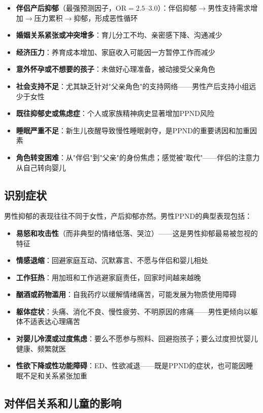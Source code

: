 \begin{enumerate}
\begin{itemize}[leftmargin=2cm]
	\item \textbf{伴侣产后抑郁}（最强预测因子，OR$=2.5$--3.0）：伴侣抑郁$\rightarrow$男性支持需求增加$\rightarrow$压力累积$\rightarrow$抑郁，形成恶性循环
	\item \textbf{婚姻关系紧张或冲突增多}：育儿分工不均、亲密感下降、沟通减少
	\item \textbf{经济压力}：养育成本增加、家庭收入可能因一方暂停工作而减少
	\item \textbf{意外怀孕或不想要的孩子}：未做好心理准备，被动接受父亲角色
	\item \textbf{社会支持不足}：尤其缺乏针对"父亲角色"的支持网络——男性产后支持小组远少于女性
	\item \textbf{既往抑郁史或焦虑症}：个人或家族精神病史显著增加PPND风险
	\item \textbf{睡眠严重不足}：新生儿夜醒导致慢性睡眠剥夺，是PPND的重要诱因和加重因素
	\item \textbf{角色转变困难}：从"伴侣"到"父亲"的身份焦虑；感觉被"取代"——伴侣的注意力从自己转向婴儿
\end{itemize}

\subsection{识别症状}

男性抑郁的表现往往不同于女性，产后抑郁亦然。男性PPND的典型表现包括：

\begin{itemize}[leftmargin=2cm]
	\item \textbf{易怒和攻击性}（而非典型的情绪低落、哭泣）——这是男性抑郁最易被忽视的特征
	\item \textbf{情感退缩}：回避家庭互动、沉默寡言、不愿与伴侣和婴儿相处
	\item \textbf{工作狂热}：用加班和工作逃避家庭责任，回家时间越来越晚
	\item \textbf{酗酒或药物滥用}：自我药疗以缓解情绪痛苦，可能发展为物质使用障碍
	\item \textbf{躯体症状}：头痛、消化不良、慢性疲劳、不明原因的疼痛——男性更倾向以躯体不适表达心理痛苦
	\item \textbf{对婴儿冷漠或过度焦虑}：要么不愿参与照料、回避抱孩子；要么过度担忧婴儿健康、频繁就医
	\item \textbf{性欲下降或性功能障碍}：ED、性欲减退——既是PPND的症状，也可能因睡眠不足和关系紧张加重
\end{itemize}

\subsection{对伴侣关系和儿童的影响}


\end{enumerate}

